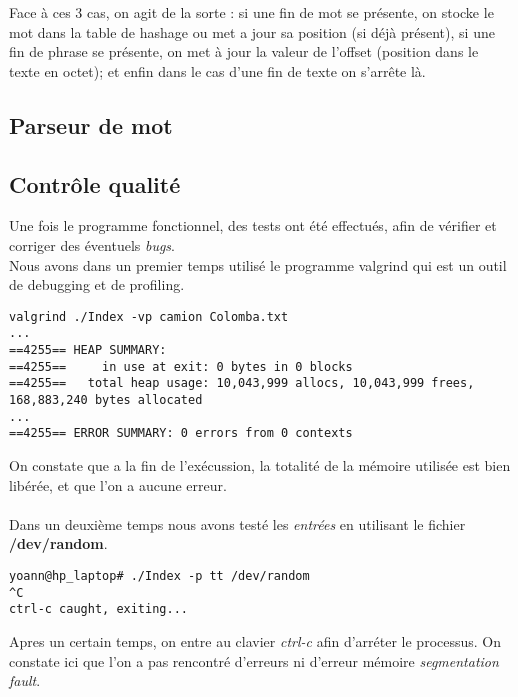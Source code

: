 \documentclass[french, 12pt, titlepage]{article}
\begin{document}
Face à ces 3 cas, on agit de la sorte : si une fin de mot se présente,
on stocke le mot dans la table de hashage ou met a jour sa position
(si déjà présent), si une fin de phrase se présente, on met à jour la
valeur de l'offset (position dans le texte en octet); et enfin dans le
cas d'une fin de texte on s'arrête là.

\subsection{Parseur de mot}

\subsection{Contrôle qualité}
Une fois le programme fonctionnel, des tests ont été effectués, afin
de vérifier et corriger des éventuels \textit{bugs}.\\
Nous avons dans un premier temps utilisé le programme valgrind qui est
un outil de debugging et de profiling.
\begin{verbatim}
valgrind ./Index -vp camion Colomba.txt
...
==4255== HEAP SUMMARY:
==4255==     in use at exit: 0 bytes in 0 blocks
==4255==   total heap usage: 10,043,999 allocs, 10,043,999 frees, 168,883,240 bytes allocated
...
==4255== ERROR SUMMARY: 0 errors from 0 contexts
\end{verbatim}
On constate que a la fin de l'exécussion, la totalité de la mémoire
utilisée est bien libérée, et que l'on a aucune erreur.\\\\

Dans un deuxième temps nous avons testé les \textit{entrées}
en utilisant le fichier \textbf{/dev/random}.
\begin{lstlisting}
yoann@hp_laptop# ./Index -p tt /dev/random
^C
ctrl-c caught, exiting...
\end{lstlisting}
Apres un certain temps, on entre au clavier \textit{ctrl-c} afin
d'arréter le processus. On constate ici que l'on a pas rencontré
d'erreurs ni d'erreur mémoire \textit{segmentation fault}.
\end{document}
